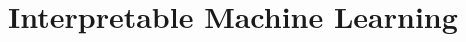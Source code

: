 \section{Interpretable Machine Learning}
\label{sec:bg-iml}
\label{sec:bg-iml-intrinsic}    %
\label{sec:bg-iml-concepts}     %
\label{sec:bg-iml-additivity}
\label{sec:rw-prototypes}       %
\label{sec:rw-concepts}
\label{sec:rw-proto-recsys}     %
